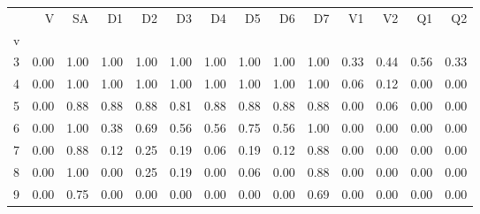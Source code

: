\begin{tabular}{lrrrrrrrrrrrrr}
\toprule
{} &    V &   SA &   D1 &   D2 &   D3 &   D4 &   D5 &   D6 &   D7 &   V1 &   V2 &   Q1 &   Q2 \\
v &      &      &      &      &      &      &      &      &      &      &      &      &      \\
\midrule
3 & 0.00 & 1.00 & 1.00 & 1.00 & 1.00 & 1.00 & 1.00 & 1.00 & 1.00 & 0.33 & 0.44 & 0.56 & 0.33 \\
4 & 0.00 & 1.00 & 1.00 & 1.00 & 1.00 & 1.00 & 1.00 & 1.00 & 1.00 & 0.06 & 0.12 & 0.00 & 0.00 \\
5 & 0.00 & 0.88 & 0.88 & 0.88 & 0.81 & 0.88 & 0.88 & 0.88 & 0.88 & 0.00 & 0.06 & 0.00 & 0.00 \\
6 & 0.00 & 1.00 & 0.38 & 0.69 & 0.56 & 0.56 & 0.75 & 0.56 & 1.00 & 0.00 & 0.00 & 0.00 & 0.00 \\
7 & 0.00 & 0.88 & 0.12 & 0.25 & 0.19 & 0.06 & 0.19 & 0.12 & 0.88 & 0.00 & 0.00 & 0.00 & 0.00 \\
8 & 0.00 & 1.00 & 0.00 & 0.25 & 0.19 & 0.00 & 0.06 & 0.00 & 0.88 & 0.00 & 0.00 & 0.00 & 0.00 \\
9 & 0.00 & 0.75 & 0.00 & 0.00 & 0.00 & 0.00 & 0.00 & 0.00 & 0.69 & 0.00 & 0.00 & 0.00 & 0.00 \\
\bottomrule
\end{tabular}
